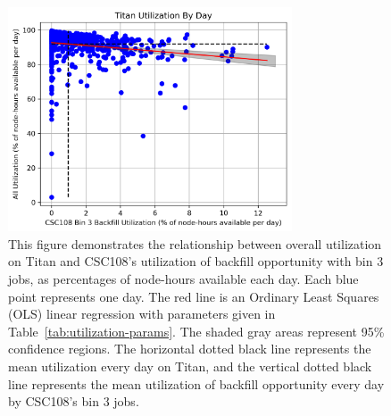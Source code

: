 \begin{figure}
  \includegraphics[width=0.75\textwidth]{images/linfit-utilization-by-true-day-bin3.png}
\caption{This figure demonstrates the relationship between overall utilization
on Titan and CSC108's utilization of backfill opportunity with bin 3 jobs, as
percentages of node-hours available each day. Each blue point represents one
day. The red line is an Ordinary Least Squares (OLS) linear regression with
parameters given in Table~\ref{tab:utilization-params}. The shaded gray areas
represent 95\% confidence regions. The horizontal dotted black line represents
the mean utilization every day on Titan, and the vertical dotted black line
represents the mean utilization of backfill opportunity every day by CSC108's
bin 3 jobs.}
\label{fig:utilization-bin3}
\end{figure}



